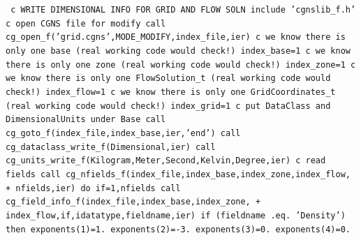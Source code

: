 \documentclass[12pt]{article}
\begin{document}
{\tt
\noindent c   WRITE DIMENSIONAL INFO FOR GRID AND FLOW SOLN
\newline\indent      include 'cgnslib\_f.h'
\newline c   open CGNS file for modify
\newline\indent      call cg\_open\_f('grid.cgns',MODE\_MODIFY,index\_file,ier)
\newline c   we know there is only one base (real working code would check!)
\newline\indent      index\_base=1
\newline c   we know there is only one zone (real working code would check!)
\newline\indent      index\_zone=1
\newline c   we know there is only one FlowSolution\_t (real working code would check!)
\newline\indent      index\_flow=1
\newline c   we know there is only one GridCoordinates\_t (real working code would check!)
\newline\indent      index\_grid=1
\newline c   put DataClass and DimensionalUnits under Base
\newline\indent      call cg\_goto\_f(index\_file,index\_base,ier,'end')
\newline\indent      call cg\_dataclass\_write\_f(Dimensional,ier)
\newline\indent      call cg\_units\_write\_f(Kilogram,Meter,Second,Kelvin,Degree,ier)
\newline c   read fields
\newline\indent      call cg\_nfields\_f(index\_file,index\_base,index\_zone,index\_flow,
\newline + \indent  nfields,ier)
\newline\indent      do if=1,nfields
\newline\indent\indent        call cg\_field\_info\_f(index\_file,index\_base,index\_zone,
\newline + \indent\indent   index\_flow,if,idatatype,fieldname,ier)
\newline\indent\indent        if (fieldname .eq. 'Density') then
\newline\indent\indent\indent          exponents(1)=1.
\newline\indent\indent\indent          exponents(2)=-3.
\newline\indent\indent\indent          exponents(3)=0.
\newline\indent\indent\indent          exponents(4)=0.
}
\end{document}
